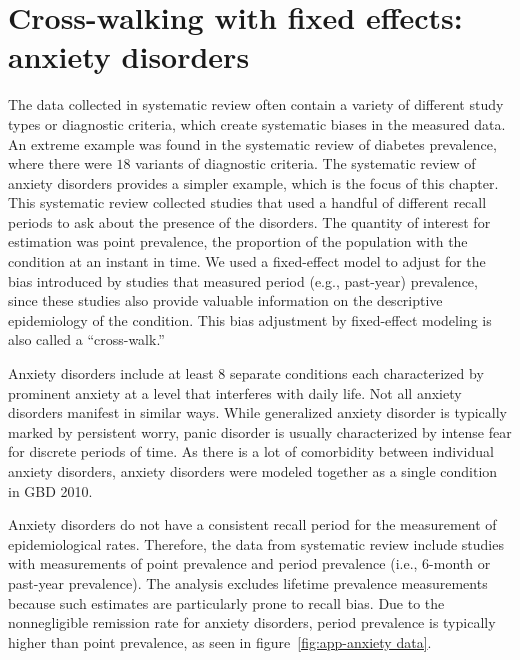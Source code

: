 \chapter{Cross-walking with fixed effects: anxiety disorders}
\label{applications-efx_study_level}

The data collected in systematic review often contain a variety of
different study types or diagnostic criteria, which create systematic
biases in the measured data.  An extreme example was found in the
systematic review of diabetes prevalence, where there were $18$ variants
of diagnostic criteria.  The systematic review of anxiety disorders
provides a simpler example, which is the focus of this chapter. This
systematic review collected studies that used a handful of different
recall periods to ask about the presence of the disorders. The quantity
of interest for estimation was point prevalence, the
proportion of the population with the condition at an instant in time.
We used a fixed-effect model to adjust for the bias introduced by
studies that measured period (e.g., past-year) prevalence, since these studies also provide
valuable information on the descriptive epidemiology of the condition.
This bias adjustment by fixed-effect modeling is also called a
``cross-walk.''

Anxiety disorders include at least $8$ separate conditions each
characterized by prominent anxiety at a level that interferes with
daily life.  Not all anxiety disorders manifest in similar ways.
While generalized anxiety disorder is typically marked by persistent
worry, panic disorder is usually characterized by intense fear for
discrete periods of time. \cite{american_psychiatric_association_diagnostic_2000} As there is
a lot of comorbidity between individual anxiety disorders, anxiety
disorders were modeled together as a single condition in GBD 2010.

Anxiety disorders do not have a consistent recall period for the
measurement of epidemiological rates.  Therefore, the data from
systematic review include studies with measurements of point prevalence
and period prevalence (i.e., $6$-month or past-year prevalence).  The
analysis excludes lifetime prevalence measurements because such estimates
are particularly prone to recall bias.  Due to the nonnegligible
remission rate for anxiety disorders, period prevalence is typically
higher than point prevalence, as seen in figure~\ref{fig:app-anxiety
  data}.

